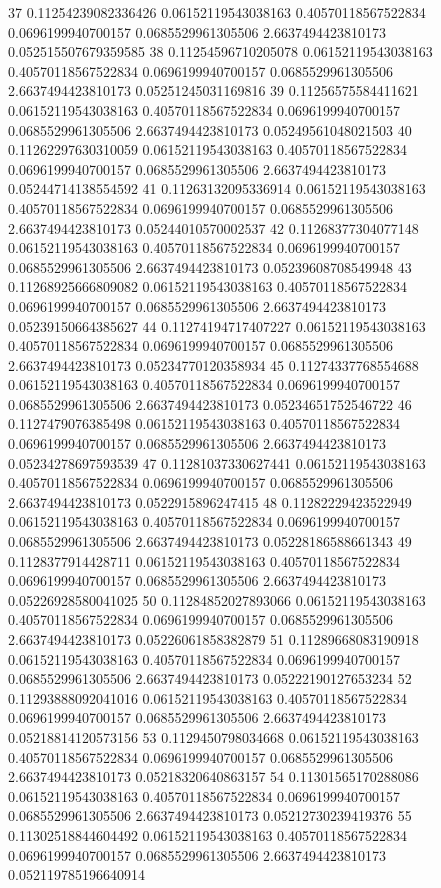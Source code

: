 {37 0.11254239082336426 0.06152119543038163 0.40570118567522834 0.0696199940700157 0.0685529961305506 2.6637494423810173 0.052515507679359585
38 0.11254596710205078 0.06152119543038163 0.40570118567522834 0.0696199940700157 0.0685529961305506 2.6637494423810173 0.05251245031169816
39 0.11256575584411621 0.06152119543038163 0.40570118567522834 0.0696199940700157 0.0685529961305506 2.6637494423810173 0.05249561048021503
40 0.11262297630310059 0.06152119543038163 0.40570118567522834 0.0696199940700157 0.0685529961305506 2.6637494423810173 0.05244714138554592
41 0.11263132095336914 0.06152119543038163 0.40570118567522834 0.0696199940700157 0.0685529961305506 2.6637494423810173 0.05244010570002537
42 0.11268377304077148 0.06152119543038163 0.40570118567522834 0.0696199940700157 0.0685529961305506 2.6637494423810173 0.05239608708549948
43 0.11268925666809082 0.06152119543038163 0.40570118567522834 0.0696199940700157 0.0685529961305506 2.6637494423810173 0.05239150664385627
44 0.11274194717407227 0.06152119543038163 0.40570118567522834 0.0696199940700157 0.0685529961305506 2.6637494423810173 0.05234770120358934
45 0.11274337768554688 0.06152119543038163 0.40570118567522834 0.0696199940700157 0.0685529961305506 2.6637494423810173 0.05234651752546722
46 0.1127479076385498 0.06152119543038163 0.40570118567522834 0.0696199940700157 0.0685529961305506 2.6637494423810173 0.05234278697593539
47 0.11281037330627441 0.06152119543038163 0.40570118567522834 0.0696199940700157 0.0685529961305506 2.6637494423810173 0.0522915896247415
48 0.11282229423522949 0.06152119543038163 0.40570118567522834 0.0696199940700157 0.0685529961305506 2.6637494423810173 0.05228186588661343
49 0.1128377914428711 0.06152119543038163 0.40570118567522834 0.0696199940700157 0.0685529961305506 2.6637494423810173 0.05226928580041025
50 0.11284852027893066 0.06152119543038163 0.40570118567522834 0.0696199940700157 0.0685529961305506 2.6637494423810173 0.05226061858382879
51 0.11289668083190918 0.06152119543038163 0.40570118567522834 0.0696199940700157 0.0685529961305506 2.6637494423810173 0.05222190127653234
52 0.11293888092041016 0.06152119543038163 0.40570118567522834 0.0696199940700157 0.0685529961305506 2.6637494423810173 0.05218814120573156
53 0.1129450798034668 0.06152119543038163 0.40570118567522834 0.0696199940700157 0.0685529961305506 2.6637494423810173 0.05218320640863157
54 0.11301565170288086 0.06152119543038163 0.40570118567522834 0.0696199940700157 0.0685529961305506 2.6637494423810173 0.05212730239419376
55 0.11302518844604492 0.06152119543038163 0.40570118567522834 0.0696199940700157 0.0685529961305506 2.6637494423810173 0.052119785196640914
}
